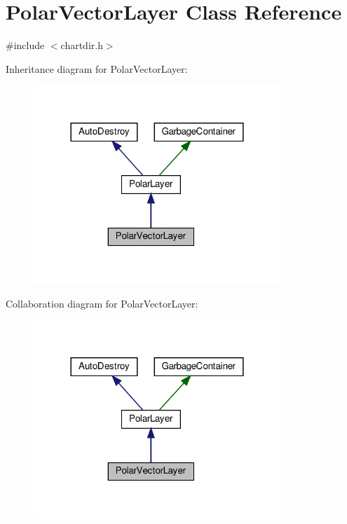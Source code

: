 \hypertarget{class_polar_vector_layer}{}\section{Polar\+Vector\+Layer Class Reference}
\label{class_polar_vector_layer}


{\ttfamily \#include $<$chartdir.\+h$>$}



Inheritance diagram for Polar\+Vector\+Layer\+:
\nopagebreak
\begin{figure}[H]
\begin{center}
\leavevmode
\includegraphics[width=264pt]{class_polar_vector_layer__inherit__graph}
\end{center}
\end{figure}


Collaboration diagram for Polar\+Vector\+Layer\+:
\nopagebreak
\begin{figure}[H]
\begin{center}
\leavevmode
\includegraphics[width=264pt]{class_polar_vector_layer__coll__graph}
\end{center}
\end{figure}
